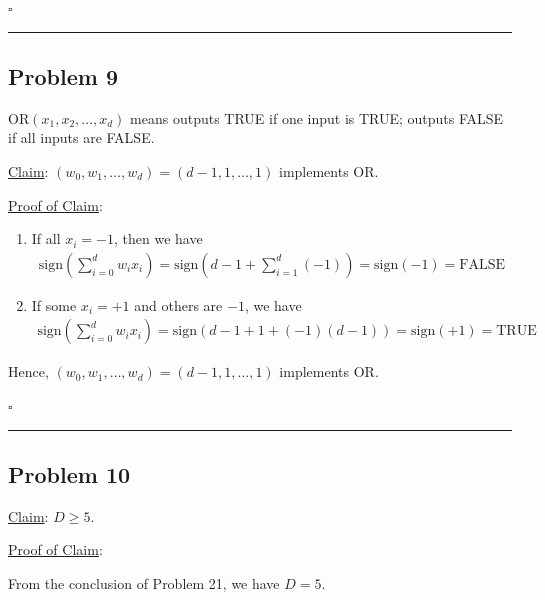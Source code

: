 \documentclass[12pt]{article}
\newcommand*{\QEDB}{\hfill\ensuremath{\square}}
\newcommand{\ParTh}[1]{\left(#1\right)}
\newcommand{\horrule}[1]{\rule{\linewidth}{#1}}
\begin{document}
\QEDB

\horrule{0.5pt}

\subsection*{Problem 9}

$\text{OR}\ParTh{x_1,x_2,\ldots,x_d}$ means outputs TRUE if one input is TRUE; outputs FALSE if all inputs are FALSE.

\underline{Claim}: $\ParTh{w_0,w_1,\ldots,w_d}=\ParTh{d-1,1,\ldots,1}$ implements $\text{OR}$.

\underline{Proof of Claim}:
\begin{enumerate}
	\item If all $x_i=-1$, then we have
	\begin{align}
	\text{sign}\ParTh{\sum_{i=0}^{d}w_ix_i}=\text{sign}\ParTh{d-1+\sum_{i=1}^{d}\ParTh{-1}}=\text{sign}\ParTh{-1}=\text{FALSE}
	\end{align}
	\item If some $x_i=+1$ and others are $-1$, we have
	\begin{align}
	\text{sign}\ParTh{\sum_{i=0}^{d}w_ix_i}=\text{sign}\ParTh{d-1+1+\ParTh{-1}\ParTh{d-1}}=\text{sign}\ParTh{+1}=\text{TRUE}
	\end{align}
\end{enumerate}
Hence, $\ParTh{w_0,w_1,\ldots,w_d}=\ParTh{d-1,1,\ldots,1}$ implements $\text{OR}$.

\QEDB

\horrule{0.5pt}

\subsection*{Problem 10}

\underline{Claim}: $D\geq5$.

\underline{Proof of Claim}:

From the conclusion of Problem 21, we have $D=5$.

\end{document}
